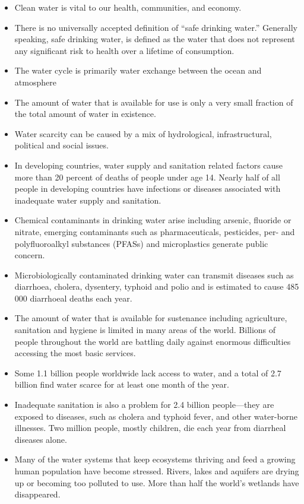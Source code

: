 \begin{itemize}
\item Clean water is vital to our health, communities, and economy. 
\item There is no universally accepted definition of “safe drinking water.” Generally speaking, safe drinking water, is defined as the water that does not represent any significant risk to health over a lifetime of consumption.
\item The water cycle is primarily water exchange between the ocean and atmosphere
\item The amount of water that is available for use is only a very small fraction of the total amount of water in existence.
\item Water scarcity can be caused by a mix of hydrological, infrastructural, political and social issues. 
\item In developing countries, water supply and sanitation related factors cause more than 20 percent of deaths of people under age 14. Nearly
half of all people in developing countries have infections or diseases associated with inadequate water supply and sanitation.
\item Chemical contaminants in drinking water arise including arsenic, fluoride or nitrate, emerging contaminants such as pharmaceuticals, pesticides, per- and polyfluoroalkyl substances (PFASs) and microplastics generate public concern.
\item Microbiologically contaminated drinking water can transmit diseases such as diarrhoea, cholera, dysentery, typhoid and polio and is estimated to cause 485 000 diarrhoeal deaths each year.
\item The amount of water that is available for sustenance including agriculture, sanitation and hygiene is limited in many areas of the world.  Billions of people throughout the world are battling daily against enormous difficulties accessing the most basic services.\\
\item Some 1.1 billion people worldwide lack access to water, and a total of 2.7 billion find water scarce for at least one month of the year.
\item Inadequate sanitation is also a problem for 2.4 billion people—they are exposed to diseases, such as cholera and typhoid fever, and other water-borne illnesses. Two million people, mostly children, die each year from diarrheal diseases alone.\\
\item Many of the water systems that keep ecosystems thriving and feed a growing human population have become stressed. Rivers, lakes and aquifers are drying up or becoming too polluted to use. More than half the world’s wetlands have disappeared.

\end{itemize}
